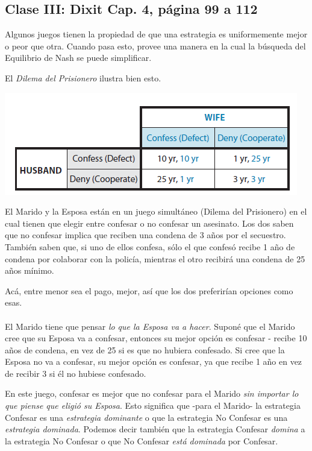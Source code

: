 \documentclass{article}
\begin{document}
    \subsection*{\textbf{Clase III: Dixit Cap. 4, página 99 a 112}}
        Algunos juegos tienen la propiedad de que una estrategia es uniformemente mejor o peor que otra. Cuando pasa esto, provee una manera en la cual la búsqueda del Equilibrio de Nash se puede simplificar.

        El \emph{Dilema del Prisionero} ilustra bien esto.

        \begin{center}
            \includegraphics[width=0.5\linewidth]{figs/fig10.PNG}
        \end{center}
        
        El Marido y la Esposa están en un juego simultáneo (Dilema del Prisionero) en el cual tienen que elegir entre confesar o no confesar un asesinato. Los dos saben que no confesar implica que reciben una condena de 3 años por el secuestro. También saben que, si uno de ellos confesa, sólo el que confesó recibe 1 año de condena por colaborar con la policía, mientras el otro recibirá una condena de 25 años mínimo.

        Acá, entre menor sea el pago, mejor, así que los dos preferirían opciones como esas.
        \\
        \\
        El Marido tiene que pensar \emph{lo que la Esposa va a hacer}. Suponé que el Marido cree que su Esposa va a confesar, entonces su mejor opción es confesar - recibe 10 años de condena, en vez de 25 si es que no hubiera confesado. Si cree que la Esposa no va a confesar, su mejor opción es confesar, ya que recibe 1 año en vez de recibir 3 si él no hubiese confesado.

        En este juego, confesar es mejor que no confesar para el Marido \emph{sin importar lo que piense que eligió su Esposa}. Esto significa que -para el Marido- la estrategia Confesar es una \emph{estrategia dominante} o que la estrategia No Confesar es una \emph{estrategia dominada}. Podemos decir también que la estrategia Confesar \emph{domina} a la estrategia No Confesar o que No Confesar \emph{está dominada} por Confesar.
\end{document}
